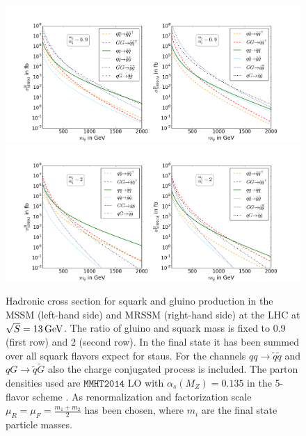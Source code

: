 \begin{figure}[!htpb]
\begin{center}
\includegraphics[scale=.4]{figures/mr=0,9_MSSM+MRSSM}
\includegraphics[scale=.4]{figures/mr=2_MSSM+MRSSM}
\caption{Hadronic cross section for squark and gluino production in the MSSM (left-hand side) and MRSSM (right-hand side) at the LHC at $\sqrt{S} = \unit[13]{GeV}$. The ratio of gluino and squark mass is fixed to 0.9 (first row) and 2 (second row). In the final state it has been summed over all squark flavors expect for staus. For the channels $qq \to \tilde{q}\tilde{q}$ and $qG \to \tilde{q}\tilde{G}$ also the charge conjugated process is included. The parton densities used are $\mathtt{MMHT2014}$ LO with $\alpha_s(M_Z) = 0.135$ in the 5-flavor scheme \cite{Harland-Lang:2014zoa}. As renormalization and factorization scale $\mu_R = \mu_F = \frac{m_1 + m_2}{2}$ has been chosen, where $m_i$ are the final state particle masses.} \label{fig:TreeXsection}
\end{center}
\end{figure}
